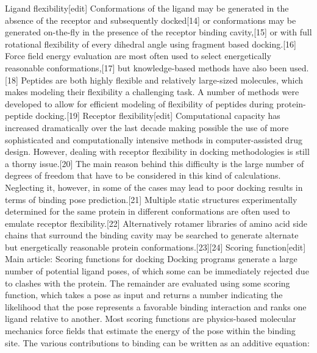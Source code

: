 Ligand flexibility[edit]
Conformations of the ligand may be generated in the absence of the receptor and subsequently docked[14] or conformations may be generated on-the-fly in the presence of the receptor binding cavity,[15] or with full rotational flexibility of every dihedral angle using fragment based docking.[16] Force field energy evaluation are most often used to select energetically reasonable conformations,[17] but knowledge-based methods have also been used.[18]
Peptides are both highly flexible and relatively large-sized molecules, which makes modeling their flexibility a challenging task. A number of methods were developed to allow for efficient modeling of flexibility of peptides during protein-peptide docking.[19]
Receptor flexibility[edit]
Computational capacity has increased dramatically over the last decade making possible the use of more sophisticated and computationally intensive methods in computer-assisted drug design. However, dealing with receptor flexibility in docking methodologies is still a thorny issue.[20] The main reason behind this difficulty is the large number of degrees of freedom that have to be considered in this kind of calculations. Neglecting it, however, in some of the cases may lead to poor docking results in terms of binding pose prediction.[21]
Multiple static structures experimentally determined for the same protein in different conformations are often used to emulate receptor flexibility.[22] Alternatively rotamer libraries of amino acid side chains that surround the binding cavity may be searched to generate alternate but energetically reasonable protein conformations.[23][24]
Scoring function[edit]
Main article: Scoring functions for docking
Docking programs generate a large number of potential ligand poses, of which some can be immediately rejected due to clashes with the protein. The remainder are evaluated using some scoring function, which takes a pose as input and returns a number indicating the likelihood that the pose represents a favorable binding interaction and ranks one ligand relative to another.
Most scoring functions are physics-based molecular mechanics force fields that estimate the energy of the pose within the binding site. The various contributions to binding can be written as an additive equation:

